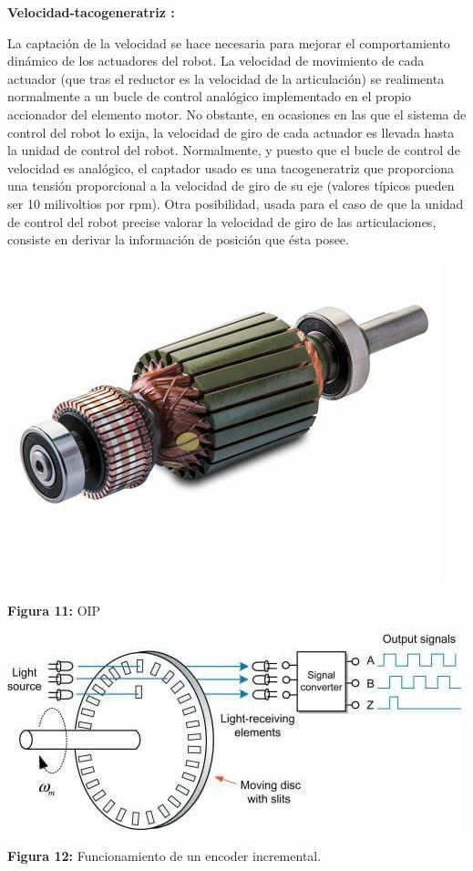 \vspace{10mm}



\textbf{Velocidad-tacogeneratriz :}

La captación de la velocidad se hace necesaria para mejorar el comportamiento dinámico de los actuadores del robot. La velocidad de movimiento de cada actuador (que tras el reductor es la velocidad de la articulación) se realimenta normalmente a un bucle de control analógico implementado en el propio accionador del elemento motor. No obstante, en ocasiones en las que el sistema de control del robot lo exija, la velocidad de giro de cada actuador es llevada hasta la unidad de control del robot. Normalmente, y puesto que el bucle de control de velocidad es analógico, el captador usado es una tacogeneratriz que proporciona una tensión proporcional a la velocidad de giro de su eje (valores típicos pueden ser 10 milivoltios por rpm). Otra posibilidad, usada para el caso de que la unidad de control del robot precise valorar la velocidad de giro de las articulaciones, consiste en derivar la información de posición que ésta posee.



\vspace{5mm}

\begin{center}
	\includegraphics[width=0.3\linewidth]{img/OIP}
	
	\vspace{2mm} %
	
	\textbf{Figura 11:} OIP
\end{center}

\vspace{5mm} %

\begin{center}
	\includegraphics[width=0.5\linewidth]{img/Sencoderincremental}
	
	\vspace{2mm} %
	
	\textbf{Figura 12:} Funcionamiento de un encoder incremental.
\end{center}

